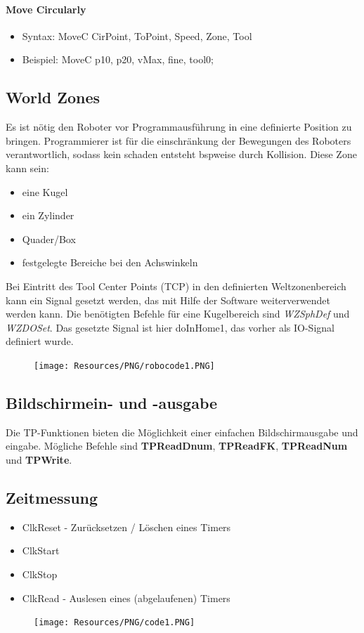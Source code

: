 \paragraph{Move Circularly}
\begin{itemize}
	\item Syntax: MoveC CirPoint, ToPoint, Speed, Zone, Tool
	\item Beispiel: MoveC p10, p20, vMax, fine, tool0;
\end{itemize}
\subsection{World Zones}
Es ist nötig den Roboter vor Programmausführung in eine definierte Position zu bringen.
Programmierer ist für die einschränkung der Bewegungen des Roboters verantwortlich, sodass kein schaden entsteht bspweise durch Kollision.
Diese Zone kann sein:
\begin{itemize}
	\item eine Kugel
	\item ein Zylinder
	\item Quader/Box
	\item festgelegte Bereiche bei den Achswinkeln
\end{itemize}
Bei Eintritt des Tool Center Points (TCP) in den definierten Weltzonenbereich kann ein Signal gesetzt werden, das mit Hilfe der Software weiterverwendet werden kann.
Die benötigten Befehle für eine Kugelbereich sind \textit{WZSphDef} und \textit{WZDOSet}.
Das gesetzte Signal ist hier doInHome1, das vorher als IO-Signal definiert wurde.
\begin{figure}[H]
	\begin{center}
		\texttt{[image: Resources/PNG/robocode1.PNG]}
		\caption{}
		\label{fig:PNG/robocode1.PNG}
	\end{center}
\end{figure}
\subsection{Bildschirmein- und -ausgabe}
Die TP-Funktionen bieten die Möglichkeit einer einfachen Bildschirmausgabe und eingabe.
Mögliche Befehle sind \textbf{TPReadDnum}, \textbf{TPReadFK}, \textbf{TPReadNum} und \textbf{TPWrite}.
\subsection{Zeitmessung}
\begin{itemize}
	\item ClkReset - Zurücksetzen / Löschen eines Timers
	\item ClkStart
	\item ClkStop
	\item ClkRead - Auslesen eines (abgelaufenen) Timers
\end{itemize}
\begin{figure}[H]
	\begin{center}
		\texttt{[image: Resources/PNG/code1.PNG]}
		\caption{}
		\label{fig:PNG/code1.PNG}
	\end{center}
\end{figure}
